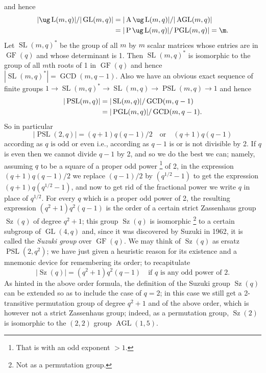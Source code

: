 and hence
$$
\split
|\ug \operatorname{L}
(m,q)|/|\operatorname{GL}(m,q)|&=|\operatorname{A}\ug 
\operatorname{L}
(m,q)|/|\operatorname{AGL}(m,q)|\\
&=
|\operatorname{P}\ug 
\operatorname{L}(m,q)|/\operatorname{PGL}(m,q)|=\m.
\endsplit
$$
Let $\operatorname{SL}(m,q)^*$ be the group of all $m$ by 
$m$ scalar matrices whose
entries are in $\operatorname{GF}(q)$ and whose 
determinant is 1. 
Then $\operatorname{SL}(m,q)^*$
is isomorphic to the group of all $m\text{th}$ roots of 1 
in $\operatorname{GF}(q)$
and hence 
$|\operatorname{SL}(m,q)^*|=\operatorname{GCD}(m,q-1)$. 
Also we have an obvious exact
sequence of finite groups $1\to \operatorname{SL}(m,q)^*\to 
\operatorname{SL}(m,q)\to \operatorname{PSL}(m,q)\to 1$
and hence
$$
\split
|\operatorname{PSL}(m,q)|&=|\operatorname{SL}(m,q)|/%
\operatorname{GCD}(m,q-1)\\
&=|\operatorname{PGL}(m,q)|/\operatorname{GCD}(m,q-1).
\endsplit
$$
So in particular
$$
|\operatorname{PSL}(2,q)|=(q+
1)q(q-1)/2\quad\text{or}\quad(q+1)q(q-1)
$$
according as $q\text{ is odd or even}$
i.e., according as $q-1$ is or is not divisible by 2.
If $q$ is even then we cannot divide $q-1$ by 2, and so we 
do the best we 
can; namely, assuming $q$ to be a square of a proper odd 
power 
\footnote{That is with an odd exponent $>1$.}
of 2, in the
expression $(q+1)q(q-1)/2$ we replace $(q-1)/2$ by 
$(q^{1/2}-1)$ to
get the expression $(q+1)q(q^{1/2}-1)$, and now to get rid 
of the
fractional power we write $q$ in place of $q^{1/2}$. For 
every $q$ which
is a proper odd power of 2, the resulting expression $(q^2+
1)q^2(q-1)$ is the 
order of a certain strict Zassenhaus group 
$\operatorname{Sz}(q)$ of degree $q^2+1$; 
this group $\operatorname{Sz}(q)$ is isomorphic 
\footnote{Not as a permutation group.}
to a certain subgroup of $\operatorname{GL}(4,q)$ and, 
since it was discovered by Suzuki \cite{Su1} in 1962, it 
is called the 
{\it Suzuki group} 
over $\operatorname{GF}(q)$.
We may think of $\operatorname{Sz}(q)$ as ersatz 
$\operatorname{PSL}(2,q^2)$; we have just
given a heuristic reason for its existence and a mnemonic 
device for 
remembering its order; to recapitulate
$$
|\operatorname{Sz}(q)|=(q^2+1)q^2(q-1)\quad\text{if $q$ is 
any odd power of 2}.
$$ 
As hinted in the above order formula, the definition of 
the Suzuki group 
$\operatorname{Sz}(q)$ can be extended so as
to include the case of $q=2$; in this case we still get a 
2-transitive 
permutation group of degree $q^2+1$ and of the above 
order, which is however
not a strict Zassenhaus group; indeed, as a permutation 
group, $\operatorname{Sz}(2)$
is isomorphic to the $(2,2)$ group 
$\operatorname{AGL}(1,5)$.

